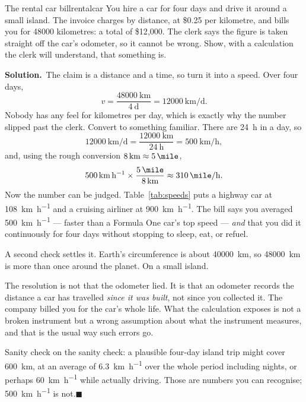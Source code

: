 \documentclass[11pt,twoside,openany]{book}
\newcounter{check}[chapter]
\newcommand{\solution}{\par\smallskip\noindent\textbf{Solution.}\ }
\newcommand{\qed}{\hfill$\blacksquare$}
\begin{document}
\begin{example}{The rental car bill}{rentalcar}
You hire a car for four days and drive it around a small island. The invoice charges by distance, at \$0.25 per kilometre, and bills you for \num{48000} kilometres: a total of \$12{,}000. The clerk says the figure is taken straight off the car's odometer, so it cannot be wrong. Show, with a calculation the clerk will understand, that something is.

\solution The claim is a distance and a time, so turn it into a speed. Over four days,
\[
v = \frac{\SI{48000}{\kilo\metre}}{\SI{4}{\day}} = \SI{12000}{\kilo\metre\per\day}.
\]
Nobody has any feel for kilometres per day, which is exactly why the number slipped past the clerk. Convert to something familiar. There are \SI{24}{\hour} in a day, so
\[
\SI{12000}{\kilo\metre\per\day} = \frac{\SI{12000}{\kilo\metre}}{\SI{24}{\hour}} = \SI{500}{\kilo\metre\per\hour},
\]
and, using the rough conversion $\SI{8}{\kilo\metre} \approx \SI{5}{\mile}$,
\[
\SI{500}{\kilo\metre\per\hour} \times \frac{\SI{5}{\mile}}{\SI{8}{\kilo\metre}} \approx \SI{310}{\mile\per\hour}.
\]
Now the number can be judged. Table~\ref{tab:speeds} puts a highway car at \SI{108}{\kilo\metre\per\hour} and a cruising airliner at \SI{900}{\kilo\metre\per\hour}. The bill says you averaged \SI{500}{\kilo\metre\per\hour} --- faster than a Formula One car's top speed --- \emph{and} that you did it continuously for four days without stopping to sleep, eat, or refuel.

A second check settles it. Earth's circumference is about \SI{40000}{\kilo\metre}, so \SI{48000}{\kilo\metre} is more than once around the planet. On a small island.

The resolution is not that the odometer lied. It is that an odometer records the distance a car has travelled \emph{since it was built}, not since you collected it. The company billed you for the car's whole life. What the calculation exposes is not a broken instrument but a wrong assumption about what the instrument measures, and that is the usual way such errors go.

Sanity check on the sanity check: a plausible four-day island trip might cover \SI{600}{\kilo\metre}, at an average of \SI{6.3}{\kilo\metre\per\hour} over the whole period including nights, or perhaps \SI{60}{\kilo\metre\per\hour} while actually driving. Those are numbers you can recognise; \SI{500}{\kilo\metre\per\hour} is not.\qed
\end{example}
\end{document}
